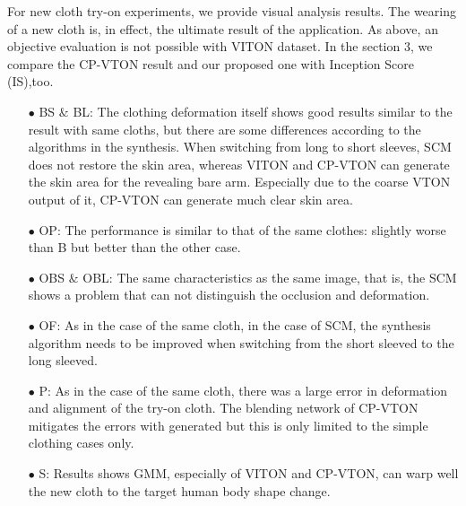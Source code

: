  
 For new cloth try-on experiments, we provide visual analysis results. The wearing of a new cloth is, in effect, the ultimate result of the application. As above, an objective evaluation is not possible with VITON dataset. In the section 3, we compare the CP-VTON result and our proposed one with Inception Score (IS),too.
 
\begin{itemize}

\item[$\bullet$] BS $\&$ BL: The clothing deformation itself shows good results similar to the result with same cloths, but there are some differences according to the algorithms in the synthesis. When switching from long to short sleeves, SCM does not restore the skin area, whereas VITON and CP-VTON can generate the skin area for the revealing bare arm. Especially due to the coarse VTON output of it, CP-VTON can generate much clear skin area.

\item[$\bullet$] OP: The performance is similar to that of the same clothes: slightly worse than B but better than the other case.

\item[$\bullet$] OBS $\&$ OBL: The same characteristics as the same image, that is, the SCM shows a problem that can not distinguish the occlusion and deformation.

\item[$\bullet$] OF: As in the case of the same cloth, in the case of SCM, the synthesis algorithm needs to be improved when switching from the short sleeved to the long sleeved.

\item[$\bullet$] P: As in the case of the same cloth, there was a large error in deformation and alignment of the try-on cloth. The blending network of CP-VTON mitigates the errors with generated but this is only limited to the simple clothing cases only.

\item[$\bullet$] S: Results shows GMM, especially of VITON and CP-VTON, can warp well the new cloth to the target human body shape change.

\end{itemize}



